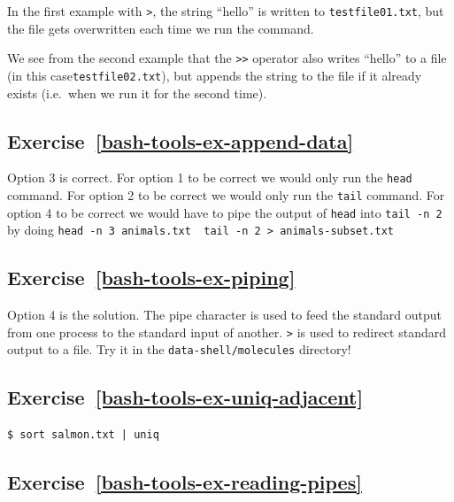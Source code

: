 \documentclass[
]{krantz}
\begin{document}
In the first example with \texttt{\textgreater{}}, the string ``hello'' is written to \texttt{testfile01.txt},
but the file gets overwritten each time we run the command.

We see from the second example that the \texttt{\textgreater{}\textgreater{}} operator also writes ``hello'' to a file
(in this case\texttt{testfile02.txt}),
but appends the string to the file if it already exists (i.e.~when we run it for the second time).

\hypertarget{exercise-refbash-tools-ex-append-data}{%
\subsection*{Exercise~\ref{bash-tools-ex-append-data}}\label{exercise-refbash-tools-ex-append-data}}


Option 3 is correct.
For option 1 to be correct we would only run the \texttt{head} command.
For option 2 to be correct we would only run the \texttt{tail} command.
For option 4 to be correct we would have to pipe the output of \texttt{head} into \texttt{tail\ -n\ 2}
by doing \texttt{head\ -n\ 3\ animals.txt\ \textbar{}\ tail\ -n\ 2\ \textgreater{}\ animals-subset.txt}

\hypertarget{exercise-refbash-tools-ex-piping}{%
\subsection*{Exercise~\ref{bash-tools-ex-piping}}\label{exercise-refbash-tools-ex-piping}}


Option 4 is the solution.
The pipe character \texttt{\textbar{}} is used to feed the standard output from one process to
the standard input of another.
\texttt{\textgreater{}} is used to redirect standard output to a file.
Try it in the \texttt{data-shell/molecules} directory!

\hypertarget{exercise-refbash-tools-ex-uniq-adjacent}{%
\subsection*{Exercise~\ref{bash-tools-ex-uniq-adjacent}}\label{exercise-refbash-tools-ex-uniq-adjacent}}


\begin{verbatim}
$ sort salmon.txt | uniq
\end{verbatim}

\hypertarget{exercise-refbash-tools-ex-reading-pipes}{%
\subsection*{Exercise~\ref{bash-tools-ex-reading-pipes}}\label{exercise-refbash-tools-ex-reading-pipes}}
\end{document}
